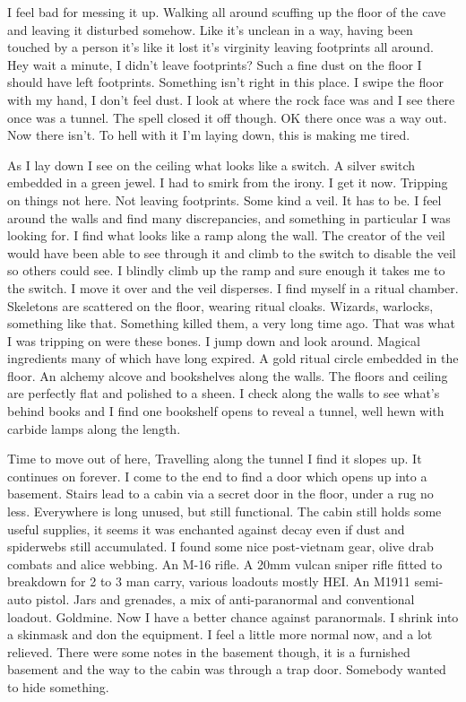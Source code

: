 I feel bad for messing it up. Walking all around scuffing up the floor of the cave and leaving it disturbed somehow. Like it's unclean in a way, having been touched by a person it's like it lost it's virginity leaving footprints all around. Hey wait a minute, I didn't leave footprints? Such a fine dust on the floor I should have left footprints. Something isn't right in this place. I swipe the floor with my hand, I don't feel dust. I look at where the rock face was and I see there once was a tunnel. The spell closed it off though. OK there once was a way out. Now there isn't. To hell with it I'm laying down, this is making me tired.

As I lay down I see on the ceiling what looks like a switch. A silver switch embedded in a green jewel. I had to smirk from the irony. I get it now. Tripping on things not here. Not leaving footprints. Some kind a veil. It has to be. I feel around the walls and find many discrepancies, and something in particular I was looking for. I find what looks like a ramp along the wall. The creator of the veil would have been able to see through it and climb to the switch to disable the veil so others could see. I blindly climb up the ramp and sure enough it takes me to the switch. I move it over and the veil disperses. I find myself in a ritual chamber. Skeletons are scattered on the floor, wearing ritual cloaks. Wizards, warlocks, something like that. Something killed them, a very long time ago. That was what I was tripping on were these bones. I jump down and look around. Magical ingredients many of which have long expired. A gold ritual circle embedded in the floor. An alchemy alcove and bookshelves along the walls. The floors and ceiling are perfectly flat and polished to a sheen. I check along the walls to see what's behind books and I find one bookshelf opens to reveal a tunnel, well hewn with carbide lamps along the length.

Time to move out of here, 
Travelling along the tunnel I find it slopes up. It continues on forever. I come to the end to find a door which opens up into a basement. Stairs lead to a cabin via a secret door in the floor, under a rug no less. Everywhere is long unused, but still functional. The cabin still holds some useful supplies, it seems it was enchanted against decay even if dust and spiderwebs still accumulated. I found some nice post-vietnam gear, olive drab combats and alice webbing. An M-16 rifle. A 20mm vulcan sniper rifle fitted to breakdown for 2 to 3 man carry, various loadouts mostly HEI. An M1911 semi-auto pistol. Jars and grenades, a mix of anti-paranormal and conventional loadout. Goldmine. Now I have a better chance against paranormals. I shrink into a skinmask and don the equipment. I feel a little more normal now, and a lot relieved. There were some notes in the basement though, it is a furnished basement and the way to the cabin was through a trap door. Somebody wanted to hide something.

